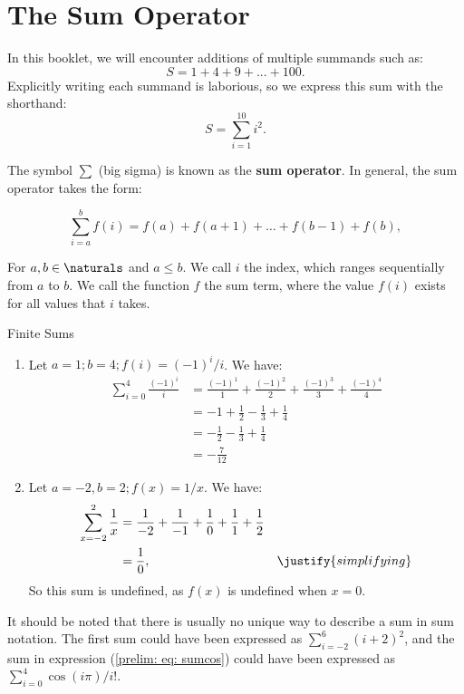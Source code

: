 \newcommand{\negfrac}[1]{\frac{ (-1)^{#1} }{ #1 } }

\section{The Sum Operator}
In this booklet, we will encounter additions of multiple summands such as:
$$ S = 1 + 4 + 9 + ... + 100. $$
Explicitly writing each summand is laborious, so we express this sum
with the shorthand: $$ S = \sum_{i=1}^{10}{i^2}. $$

The symbol $\sum$ (big sigma) is known as the \textbf{sum operator}. In
general, the sum operator takes the form:

$$ \sum_{i=a}^{b} f(i) = f(a) + f(a+1) + \ldots + f(b-1) + f(b),$$

For $a, b \in \naturals$ and $a \leq b$. We call $i$ the index, which ranges
sequentially from $a$ to $b$. We call the function $f$ the sum term, where
the value $f(i)$ exists for all values that $i$ takes.

\begin{expl}{Finite Sums}
  \begin{enumerate}
    \item Let $a = 1; b = 4; f(i) = (-1)^i/i$. We have:
    \begin{align}
      \sum_{i=0}^{4} \frac{ (-1)^i }{ i }
        &= \negfrac{1} + \negfrac{2}
        + \negfrac{3} + \negfrac{4}  \label{prelim: eq: sumcos} \\
        &= - 1 + \frac{1}{2} - \frac{1}{3} + \frac{1}{4} \\
        &= -\frac{1}{2} - \frac{1}{3} + \frac{1}{4} \\
        &= -\frac{7}{12}
    \end{align}

    \item Let $a = -2, b = 2; f(x) = 1/x$. We have:
    \begin{align}
      \sum_{x=-2}^{2} \frac{1}{x}
        &= \frac{1}{-2} + \frac{1}{-1} + \frac{1}{0} + \frac{1}{1}
        + \frac{1}{2} \\
        &= \frac{1}{0}, & \justify{ simplifying }
    \end{align}
    So this sum is undefined, as $f(x)$ is undefined when $x = 0$.
  \end{enumerate}
\end{expl}

It should be noted that there is usually no unique way to describe a sum in
sum notation. The first sum could have been expressed as
$\sum_{i=-2}^{6}{(i+2)^2}$, and the sum in expression
(\ref{prelim: eq: sumcos}) could have been expressed as
$\sum_{i=0}^{4}{ \cos(i\pi) / {i!} }.$

